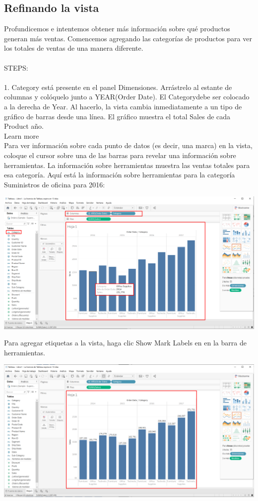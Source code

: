 \documentclass[12pt,letterpaper]{article}
\begin{document}
\subsection{Refinando la vista}
Profundicemos e intentemos obtener más información sobre qué productos generan más
ventas. Comencemos agregando las categorías de productos para ver los totales de ventas de una
manera diferente.
\\\\STEPS:
\\\\1. Category está presente en el panel Dimensiones. Arrástrelo al estante de columnas y colóquelo
junto a YEAR(Order Date). El Categorydebe ser colocado a la derecha de Year. Al
hacerlo, la vista cambia inmediatamente a un tipo de gráfico de barras desde una línea. El
gráfico muestra el total Sales de cada Product año.
\\Learn more
\\Para ver información sobre cada punto de datos (es decir, una marca) en la vista, coloque el
cursor sobre una de las barras para revelar una información sobre herramientas. La información
sobre herramientas muestra las ventas totales para esa categoría. Aquí está la información sobre
herramientas para la categoría Suministros de oficina para 2016:
\begin{center}
    \includegraphics[width=16cm]{img/8.png}  
\end{center}
Para agregar etiquetas a la vista, haga clic Show Mark Labels en en la barra de herramientas.
\begin{center}
    \includegraphics[width=16cm]{img/9.png}  
\end{center}
\end{document}
